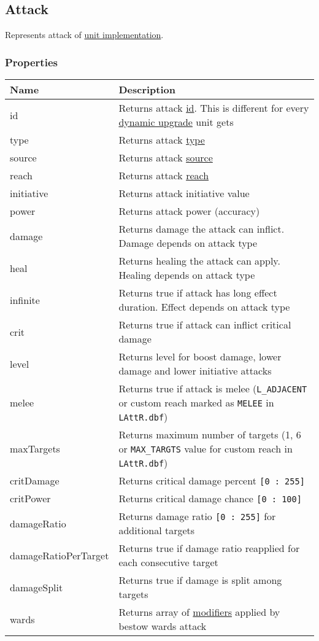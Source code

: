\subsection{Attack}
\label{Attack}
Represents attack of \hyperref[UnitImpl]{unit implementation}.
\subsubsection{Properties}
\begin{center}
\begin{tabularx}{\linewidth}{| l | X |}
\hline
\textbf{Name} & \textbf{Description} \\
\hline
id & Returns attack \hyperref[Id]{id}. This is different for every \hyperref[DynamicUpgrade]{dynamic upgrade} unit gets\\
\hline
type & Returns attack \hyperref[AttackCategory]{type}\\
\hline
source & Returns attack \hyperref[SourceCategory]{source}\\
\hline
reach & Returns attack \hyperref[ReachCategory]{reach}\\
\hline
initiative & Returns attack initiative value\\
\hline
power & Returns attack power (accuracy)\\
\hline
damage & Returns damage the attack can inflict. Damage depends on attack type\\
\hline
heal & Returns healing the attack can apply. Healing depends on attack type\\
\hline
infinite & Returns true if attack has long effect duration. Effect depends on attack type\\
\hline
crit & Returns true if attack can inflict critical damage\\
\hline
level & Returns level for boost damage, lower damage and lower initiative attacks\\
\hline
melee & Returns true if attack is melee (\texttt{L\_ADJACENT} or custom reach marked as \texttt{MELEE} in \texttt{LAttR.dbf})\\
\hline
maxTargets & Returns maximum number of targets (1, 6 or \texttt{MAX\_TARGTS} value for custom reach in \texttt{LAttR.dbf})\\
\hline
critDamage & Returns critical damage percent \texttt{[0 : 255]}\\
\hline
critPower & Returns critical damage chance \texttt{[0 : 100]}\\
\hline
damageRatio & Returns damage ratio \texttt{[0 : 255]} for additional targets\\
\hline
damageRatioPerTarget & Returns true if damage ratio reapplied for each consecutive target\\
\hline
damageSplit & Returns true if damage is split among targets\\
\hline
wards & Returns array of \hyperref[Modifier]{modifiers} applied by bestow wards attack\\
\hline
\end{tabularx}
\end{center}